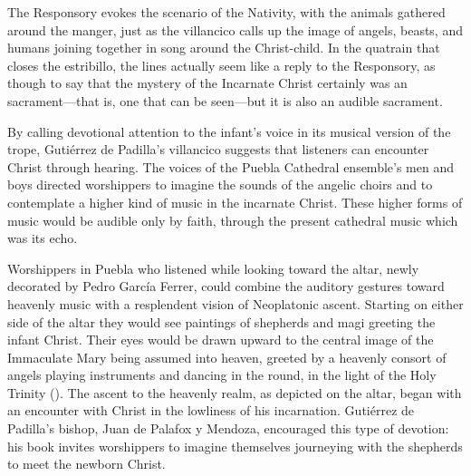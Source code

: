 
The Responsory evokes the scenario of the Nativity, with the animals gathered
around the manger, just as the villancico calls up the image of angels, beasts,
and humans joining together in song around the Christ-child.
In the quatrain that closes the estribillo, the lines  actually seem like a reply to the Responsory,
as though to say that the mystery of the Incarnate Christ certainly was an
 sacrament---that is, one that can be seen---but it is also
an audible sacrament.

By calling devotional attention to the infant's voice in its musical version of
the  trope, Gutiérrez de Padilla's villancico suggests that
listeners can encounter Christ through hearing.
The voices of the Puebla Cathedral ensemble's men and boys directed worshippers
to imagine the sounds of the angelic choirs and to contemplate a higher kind of
music in the incarnate Christ.
These higher forms of music would be audible only by faith, through the present
cathedral music which was its echo.

Worshippers in Puebla who listened while looking toward the altar, newly
decorated by Pedro García Ferrer, could combine the auditory gestures toward
heavenly music with a resplendent vision of Neoplatonic ascent.%
    \Autocites
    {Merlo:PueblaCat}
    {Gali:GarciaFerrer}
Starting on either side of the altar they would see paintings of shepherds and
magi greeting the infant Christ.
Their eyes would be drawn upward to the central image of the Immaculate Mary
being assumed into heaven, greeted by a heavenly consort of angels playing
instruments and dancing in the round, in the light of the Holy Trinity
().%
   \Autocite[The complex is in part a visual embodiment of musical encomium:][]
   {Schmidt:Lob_der_Musik}
The ascent to the heavenly realm, as depicted on the altar, began with an
encounter with Christ in the lowliness of his incarnation. 
Gutiérrez de Padilla's bishop, Juan de  Palafox y Mendoza, encouraged this type
of devotion: his book  invites worshippers to
imagine themselves journeying with the shepherds to meet the newborn Christ.%
    \Autocite{Palafox:Nochebuena}


